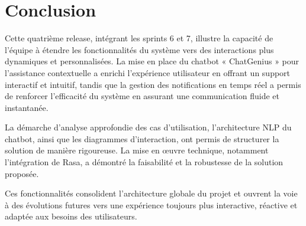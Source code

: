 \section{Conclusion}

Cette quatrième release, intégrant les sprints 6 et 7, illustre la capacité de l’équipe à étendre les fonctionnalités du système vers des interactions plus dynamiques et personnalisées. La mise en place du chatbot « ChatGenius » pour l’assistance contextuelle a enrichi l’expérience utilisateur en offrant un support interactif et intuitif, tandis que la gestion des notifications en temps réel a permis de renforcer l’efficacité du système en assurant une communication fluide et instantanée.

La démarche d’analyse approfondie des cas d’utilisation, l’architecture NLP du chatbot, ainsi que les diagrammes d’interaction, ont permis de structurer la solution de manière rigoureuse. La mise en œuvre technique, notamment l’intégration de Rasa, a démontré la faisabilité et la robustesse de la solution proposée.

Ces fonctionnalités consolident l’architecture globale du projet et ouvrent la voie à des évolutions futures vers une expérience toujours plus interactive, réactive et adaptée aux besoins des utilisateurs.
